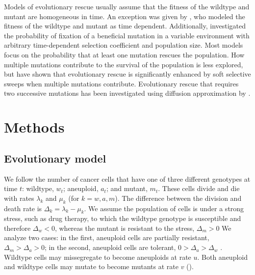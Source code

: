 \documentclass[12pt]{extarticle}
\begin{document}
Models of evolutionary rescue usually assume that the fitness of the wildtype and mutant are homogeneous in time. An exception was given by \citet{marrec2020adapt}, who modeled the fitness of the wildtype and mutant as time dependent. Additionally, \citet{uecker2011fixation} investigated the probability of fixation of a beneficial mutation in a variable environment with arbitrary time-dependent selection coefficient and population size.
Most models focus on the probability that at least one mutation rescues the population. How multiple mutations contribute to the survival of the population is less explored, but \citet{wilson2017soft} have shown that evolutionary rescue is significantly enhanced by soft selective sweeps when multiple mutations contribute. 
Evolutionary rescue that requires two successive mutations has been investigated using diffusion approximation by \citet{martin2013probability}.


\section*{Methods}
\subsection*{Evolutionary model}

We follow the number of cancer cells that have one of three different genotypes at time $t$: wildtype, $w_t$; aneuploid, $a_t$; and mutant, $m_t$. 
These cells divide and die with rates $\lambda_k$ and $\mu_k$ (for $k=w, a, m$).
The difference between the division and death rate is $\Delta_k = \lambda_k-\mu_k$.
We assume the population of cells is under a strong stress, such as drug therapy, to which the wildtype genotype is susceptible and therefore $\Delta_w<0$, whereas the mutant is resistant to the stress, $\Delta_m>0$
We analyze two cases: in the first, aneuploid cells are partially resistant, $\Delta_m>\Delta_a>0$; in the second, aneuploid cells are tolerant, $0>\Delta_a>\Delta_w$ \citep[see][for the distinction between susceptible, resistant, and tolerant]{brauner2016distinguishing}.
Wildtype cells may missegregate to become aneuploids at rate $u$. Both aneuploid and wildtype cells may mutate to become mutants at rate $v$ (). 
\end{document}
